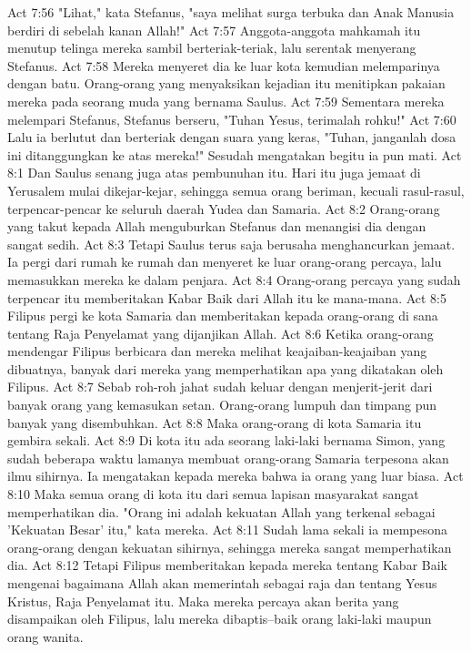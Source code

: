 Act 7:56  "Lihat," kata Stefanus, "saya melihat surga terbuka dan Anak Manusia berdiri di sebelah kanan Allah!"
Act 7:57  Anggota-anggota mahkamah itu menutup telinga mereka sambil berteriak-teriak, lalu serentak menyerang Stefanus.
Act 7:58  Mereka menyeret dia ke luar kota kemudian melemparinya dengan batu. Orang-orang yang menyaksikan kejadian itu menitipkan pakaian mereka pada seorang muda yang bernama Saulus.
Act 7:59  Sementara mereka melempari Stefanus, Stefanus berseru, "Tuhan Yesus, terimalah rohku!"
Act 7:60  Lalu ia berlutut dan berteriak dengan suara yang keras, "Tuhan, janganlah dosa ini ditanggungkan ke atas mereka!" Sesudah mengatakan begitu ia pun mati.
Act 8:1  Dan Saulus senang juga atas pembunuhan itu. Hari itu juga jemaat di Yerusalem mulai dikejar-kejar, sehingga semua orang beriman, kecuali rasul-rasul, terpencar-pencar ke seluruh daerah Yudea dan Samaria.
Act 8:2  Orang-orang yang takut kepada Allah menguburkan Stefanus dan menangisi dia dengan sangat sedih.
Act 8:3  Tetapi Saulus terus saja berusaha menghancurkan jemaat. Ia pergi dari rumah ke rumah dan menyeret ke luar orang-orang percaya, lalu memasukkan mereka ke dalam penjara.
Act 8:4  Orang-orang percaya yang sudah terpencar itu memberitakan Kabar Baik dari Allah itu ke mana-mana.
Act 8:5  Filipus pergi ke kota Samaria dan memberitakan kepada orang-orang di sana tentang Raja Penyelamat yang dijanjikan Allah.
Act 8:6  Ketika orang-orang mendengar Filipus berbicara dan mereka melihat keajaiban-keajaiban yang dibuatnya, banyak dari mereka yang memperhatikan apa yang dikatakan oleh Filipus.
Act 8:7  Sebab roh-roh jahat sudah keluar dengan menjerit-jerit dari banyak orang yang kemasukan setan. Orang-orang lumpuh dan timpang pun banyak yang disembuhkan.
Act 8:8  Maka orang-orang di kota Samaria itu gembira sekali.
Act 8:9  Di kota itu ada seorang laki-laki bernama Simon, yang sudah beberapa waktu lamanya membuat orang-orang Samaria terpesona akan ilmu sihirnya. Ia mengatakan kepada mereka bahwa ia orang yang luar biasa.
Act 8:10  Maka semua orang di kota itu dari semua lapisan masyarakat sangat memperhatikan dia. "Orang ini adalah kekuatan Allah yang terkenal sebagai 'Kekuatan Besar' itu," kata mereka.
Act 8:11  Sudah lama sekali ia mempesona orang-orang dengan kekuatan sihirnya, sehingga mereka sangat memperhatikan dia.
Act 8:12  Tetapi Filipus memberitakan kepada mereka tentang Kabar Baik mengenai bagaimana Allah akan memerintah sebagai raja dan tentang Yesus Kristus, Raja Penyelamat itu. Maka mereka percaya akan berita yang disampaikan oleh Filipus, lalu mereka dibaptis--baik orang laki-laki maupun orang wanita.
